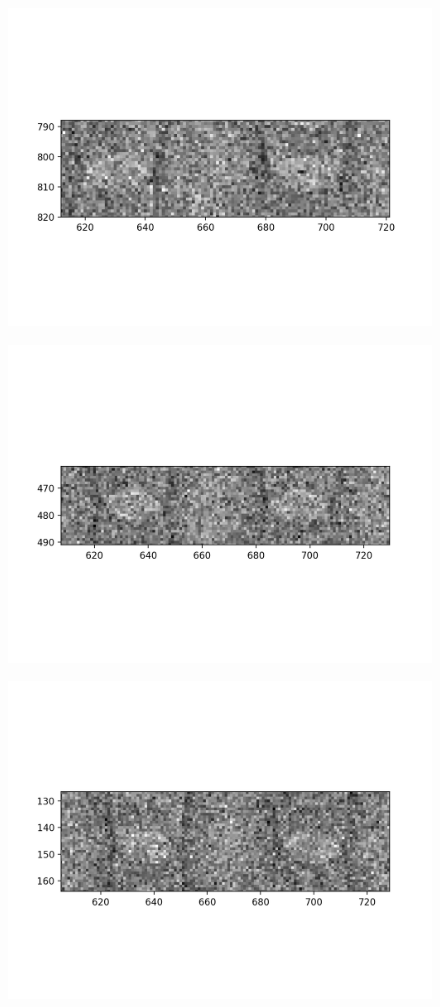 \documentclass[10pt,a4paper]{article}
\begin{document}
\begin{figure}
	\includegraphics{data/image_stamps/b7}
\end{figure}
\begin{figure}
	\includegraphics{data/image_stamps/b8}
\end{figure}
\begin{figure}
	\includegraphics{data/image_stamps/b9}
\end{figure}
\end{document}
